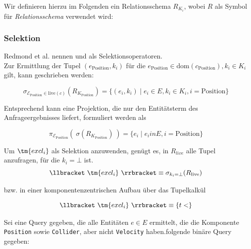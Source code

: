 \noindent
Wir definieren hierzu im Folgenden ein Relationsschema $R_{K_i}$, wobei $R$ als Symbol für \textit{Relationsschema} verwendet wird:


\subsubsection*{Selektion}

Redmond et al. nennen  und  als Selektionsoperatoren.\\

Zur Ermittlung der Tupel $(e_\text{Position}, k_i)$ für die $e_\text{Position} \in \text{dom}(c_\text{Position}), k_i \in K_i$ gilt, kann geschrieben werden:

\[
    \sigma_{\mathcal{E}_\text{Position} \in \text{live}(c) } (R_{K_\text{Position}}) = \{ (e_i, k_i) \mid e_i \in E, k_i \in K_i, i =\text{Position}  \}
\]

\noindent
Entsprechend kann eine Projektion, die nur den Entitätsterm des Anfrageergebnisses liefert, formuliert werden als


\[
    \pi_{\mathcal{E}_\text{Position}} (\ \sigma (R_{K_\text{Position}})\ ) = \{ e_i \mid e_i in E, i =\text{Position}  \}
\]

\bigskip
\noindent
Um $\tm{excl_i}$ als Selektion anzuwenden, genügt es, in $R_{live}$ alle Tupel anzufragen, für die $k_i = \bot$ ist.
\[
    \llbracket \ \tm{excl_i} \ \rrbracket \equiv \sigma_{k_i = \bot} (R_\text{live})
\]

bzw. in einer komponentenzentrischen Aufbau über das Tupelkalkül

\[
    \llbracket \ \tm{excl_i} \ \rrbracket \equiv  \{t <\}
\]

\begin{example}

    Sei eine Query gegeben, die alle Entitäten $e \in E$ ermittelt, die die Komponente \texttt{Position} sowie \texttt{Collider},
    aber nicht \texttt{Velocity} haben.folgende binäre Query gegeben:

    \[

    \]

    \label{ex:bin_query}
\end{example}